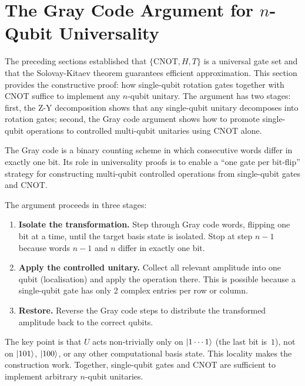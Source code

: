 \documentclass[12pt, a4paper, oneside]{report}
\theoremstyle{plain}
\theoremstyle{definition}
\theoremstyle{remark}
\newcommand{\CNOT}{\mathrm{CNOT}}
\begin{document}

\section{The Gray Code Argument for \texorpdfstring{$n$}{n}-Qubit Universality}
\label{sec:graycodearg}

The preceding sections established that $\{\CNOT, H, T\}$ is a universal gate set and that
the Solovay-Kitaev theorem guarantees efficient approximation. This section provides the
constructive proof: how single-qubit rotation gates together with $\CNOT$ suffice to implement
any $n$-qubit unitary. The argument has two stages: first, the Z-Y decomposition shows that
any single-qubit unitary decomposes into rotation gates; second, the Gray code argument shows
how to promote single-qubit operations to controlled multi-qubit unitaries using $\CNOT$ alone.

The Gray code is a binary counting scheme in which consecutive words differ in exactly one
bit. Its role in universality proofs is to enable a ``one gate per bit-flip'' strategy for
constructing multi-qubit controlled operations from single-qubit gates and $\CNOT$.

The argument proceeds in three stages:
\begin{enumerate}
  \item \textbf{Isolate the transformation.} Step through Gray code words, flipping one bit
        at a time, until the target basis state is isolated. Stop at step $n-1$ because words
        $n-1$ and $n$ differ in exactly one bit.
  \item \textbf{Apply the controlled unitary.} Collect all relevant amplitude into one qubit
        (localisation) and apply the operation there. This is possible because a single-qubit
        gate has only 2 complex entries per row or column.
  \item \textbf{Restore.} Reverse the Gray code steps to distribute the transformed
        amplitude back to the correct qubits.
\end{enumerate}

The key point is that $U$ acts non-trivially only on $\ket{1\cdots1}$ (the last bit is~$1$),
not on $\ket{101}$, $\ket{100}$, or any other computational basis state. This locality makes
the construction work. Together, single-qubit gates and $\CNOT$ are sufficient to implement
arbitrary $n$-qubit unitaries.
\end{document}
